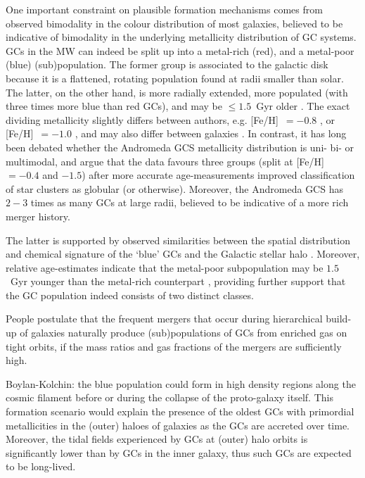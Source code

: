 \documentclass[a4paper,fleqn,usenatbib]{mnras}
\begin{document}
One important constraint on plausible formation mechanisms comes from observed
bimodality in the colour distribution of most galaxies, believed to be indicative
of bimodality in the underlying metallicity distribution of GC systems. GCs in
the MW can indeed be split up into a metal-rich (red), and a metal-poor (blue)
(sub)population. The former group is associated to the galactic disk because it
is a flattened, rotating population found at radii smaller than solar. The latter,
on the other hand, is more radially extended, more populated (with three times
more blue than red GCs), and may be $\leq 1.5$~Gyr older \citep{2005AJ....130..116D}.
The exact dividing metallicity slightly differs between authors, e.g.
[Fe/H]~$=-0.8$ \citep[according to][]{1985ApJ...293..424Z}, or
[Fe/H]~$=-1.0$ \citep[according to][]{Harris2001}, and may also differ between
galaxies \citep[e.g.][]{1985ApJ...293..424Z, 1999AJ....118.1526G, 2001AJ....121.2974L,
2006ApJ...639...95P}. In contrast, it has long been debated whether the Andromeda
GCS metallicity distribution is uni- bi- or multimodal, and \citet{2016ApJ...824...42C}
argue that the data favours three groups (split at [Fe/H] $= -0.4$ and $-1.5$)
after more accurate age-measurements improved classification of star clusters
as globular (or otherwise). Moreover, the Andromeda GCS has $2-3$ times as many
GCs at large radii, believed to be indicative of a more rich merger history.


The latter is supported by observed similarities between the spatial distribution
and chemical signature of the `blue' GCs and the Galactic stellar halo
\citep{2008A&ARv..15..145H}. Moreover, relative age-estimates indicate that the
metal-poor subpopulation may be $1.5$~Gyr younger than the metal-rich counterpart
\citep{2005AJ....130..116D}, providing further support that the GC population indeed
consists of two distinct classes.

People postulate that the frequent mergers that occur during hierarchical build-up
of galaxies naturally produce (sub)populations of GCs from enriched gas on tight
orbits, if the mass ratios and gas fractions of the mergers are sufficiently high.

Boylan-Kolchin: the blue population could form in high density regions along the
cosmic filament before or during the collapse of the proto-galaxy itself.
This formation scenario would explain the presence of the oldest GCs with
primordial metallicities in the (outer) haloes of galaxies as the GCs are
accreted over time. Moreover, the tidal fields experienced by GCs at (outer) halo
orbits is significantly lower than by GCs in the inner galaxy, thus such GCs
are expected to be long-lived.
\end{document}
